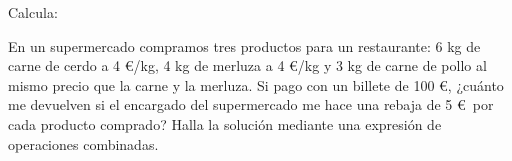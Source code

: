 \documentclass[addpoints,spanish, 12pt,a4paper]{exam}
\begin{document}
\begin{questions}

\question[2] Calcula:

\question[2] En un supermercado compramos tres productos para
  un restaurante: 6 kg de carne de cerdo a 4 \euro/kg, 4 kg de merluza a 4
  \euro/kg y 3 kg de carne de pollo al mismo precio que la carne y la
  merluza. Si pago con un billete de 100 \euro, ¿cuánto me devuelven si el
  encargado del supermercado me hace una rebaja de 5 \euro \ por cada producto
  comprado? Halla la solución mediante una expresión de operaciones
  combinadas. \vspace{100pt}


\end{questions}
\end{document}
